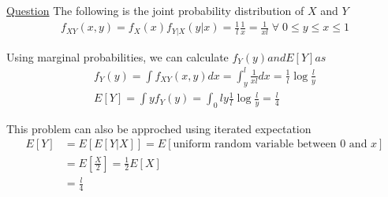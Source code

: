 \documentclass[11pt, a4paper]{article}
\begin{document}
\begin{enumerate}
        \hypertarget{a_breakstick}{\item} \hyperlink{q_breakstick}{Question}\newline
        The following is the joint probability distribution of $X$ and $Y$
        \begin{align*}
            f_{XY}(x, y) = f_{X}(x) f_{Y|X}(y|x) = \frac{1}{l} \frac{1}{x} = \frac{1}{xl} \;\forall\; 0 \leq y \leq x \leq 1
        \end{align*}
        
        Using marginal probabilities, we can calculate $f_{Y}(y) and E[Y] as$
        \begin{align*}
            f_{Y}(y) = \int f_{XY}(x,y) dx = \int_{y}^{l} \frac{1}{xl} dx = \frac{1}{l} \log \frac{l}{y} \tag*{Note that for any $y$, $y \leq x \leq l$}\\
            E[Y] = \int y f_{Y}(y) = \int_{0}{l} y \frac{1}{l} \log\frac{l}{y} = \frac{l}{4}
        \end{align*}

        This problem can also be approched using iterated expectation
        \begin{align*}
            E[Y] &= E[E[Y|X]] = E[\text{uniform random variable between $0$ and $x$}]\\
                &= E[\frac{X}{2}] =\frac{1}{2}E[X]\\
                &= \frac{l}{4} 
        \end{align*}


\end{enumerate}
\end{document}
